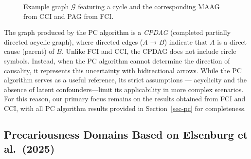 \documentclass[
]{article}
\begin{document}
\begin{figure}
\begin{minipage}{0.33\linewidth}
{}


\end{minipage}%
%
\begin{minipage}{0.33\linewidth}



\end{minipage}%

\caption{\label{fig-examplegraphs}Example graph \(\mathcal{G}\)
featuring a cycle and the corresponding MAAG from CCI and PAG from FCI.}

\end{figure}%

The graph produced by the PC algorithm is a \emph{CPDAG} (completed
partially directed acyclic graph), where directed edges (\(A\) → \(B\))
indicate that \(A\) is a direct cause (parent) of \(B\). Unlike FCI and
CCI, the CPDAG does not include circle symbols. Instead, when the PC
algorithm cannot determine the direction of causality, it represents
this uncertainty with bidirectional arrows. While the PC algorithm
serves as a useful reference, its strict assumptions --- acyclicity and
the absence of latent confounders---limit its applicability in more
complex scenarios. For this reason, our primary focus remains on the
results obtained from FCI and CCI, with all PC algorithm results
provided in Section~\ref{sec-pc} for completeness.

\subsection{Precariousness Domains Based on Elsenburg et
al.~(2025)}\label{precariousness-domains-based-on-elsenburg-et-al.-2025}
\end{document}
